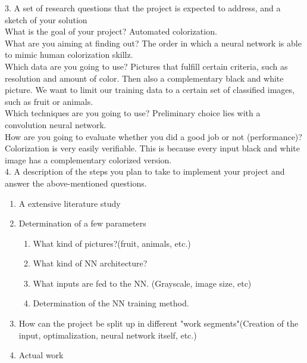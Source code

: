 3. A set of research questions that the project is expected to address, and a sketch of your solution\\
What is the goal of your project? Automated colorization.\\
What are you aiming at finding out? The order in which a neural network is able to mimic human colorization skillz. \\
Which data are you going to use? Pictures that fulfill certain criteria, such as resolution and amount of color. Then also a complementary black and white picture.
We want to limit our training data to a certain set of classified images, such as fruit or animals.\\
Which techniques are you going to use? Preliminary choice lies with a convolution neural network.\\
How are you going to evaluate whether you did a good job or not (performance)? Colorization is very easily verifiable. This is because every input black and white image has a complementary colorized version.\\
4. A description of the steps you plan to take to implement your project and answer the above-mentioned questions. \\
\begin{enumerate}
\item	A extensive literature study
\item	Determination of a few parameters
	\begin{enumerate}
		\item What kind of pictures?(fruit, animals, etc.)
		\item What kind of NN architecture? 
		\item What inputs are fed to the NN. (Grayscale, image size, etc)
		\item Determination of the NN training method. 
	\end{enumerate}

\item How can the project be split up in different "work segments"(Creation of the input, optimalization, neural network itself, etc.)
\item Actual work

\end{enumerate}		
